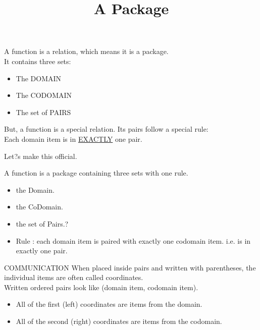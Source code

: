 \documentclass{ximera}
\title{A Package}
\begin{document}
\begin{abstract}
\end{abstract}

\maketitle





\begin{sectionOutcomes}

A function is a relation, which means it is a package.\\
It contains three sets:
\begin{itemize}
\item The DOMAIN
\item The CODOMAIN
\item The set of PAIRS
\end{itemize}
\end{sectionOutcomes}


But, a function is a special relation.  Its pairs follow a special rule: \\
Each domain item is in \underline{EXACTLY} one pair.

Let?s make this official.


\begin{definition}  
A function is a package containing three sets with one rule.
\begin{itemize}
\item the Domain. 
\item the CoDomain. 
\item the set of Pairs.?
\item Rule : each domain item is paired with exactly one codomain item.  i.e. is in exactly one pair.
\end{itemize}
\end{definition}



\begin{remark} COMMUNICATION
When placed inside pairs and written with parentheses, the individual items are often called coordinates. \\
Written ordered pairs look like (domain item, codomain item).
\begin{itemize}
\item All of the first (left) coordinates are items from the domain.
\item All of the second (right) coordinates are items from the codomain.
\end{itemize}
\end{remark}
\end{document}
